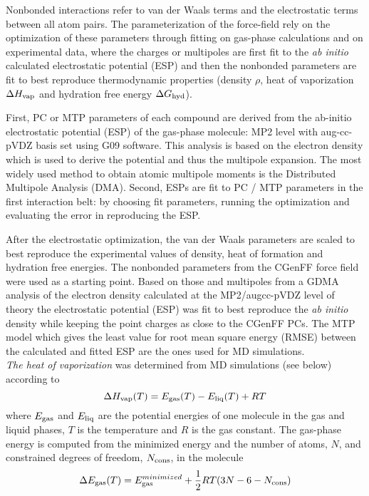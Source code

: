 \documentclass[journal=jacsat,manuscript=article]{achemso}
\begin{document}
\noindent
Nonbonded interactions refer to van der Waals terms and the
electrostatic terms between all atom pairs. The parameterization of
the force-field rely on the optimization of these parameters through
fitting on gas-phase calculations and on experimental data, where the
charges or multipoles are first fit to the {\it ab initio} calculated
electrostatic potential (ESP) and then the nonbonded parameters are
fit to best reproduce thermodynamic properties (density $\rho$, heat
of vaporization $\Delta H_{\rm vap}$ and hydration free energy $\Delta
G_{\rm hyd}$).
 
\noindent
First, PC or MTP parameters of each compound are derived from the
ab-initio electrostatic potential (ESP) of the gas-phase molecule: MP2
level with aug-cc-pVDZ basis set using G09 software. This analysis is
based on the electron density which is used to derive the potential
and thus the multipole expansion. The most widely used method to
obtain atomic multipole moments is the Distributed Multipole Analysis
(DMA).  Second, ESPs are fit to PC / MTP parameters in the first
interaction belt: by choosing fit parameters, running the optimization
and evaluating the error in reproducing the ESP.

\noindent
After the electrostatic optimization, the van der Waals parameters are
scaled to best reproduce the experimental values of density, heat of
formation and hydration free energies. The nonbonded parameters from
the CGenFF\cite{cgenff2012} force field were used as a starting
point. Based on those and multipoles from a GDMA
analysis\cite{Stone05p1128} of the electron density calculated at the
MP2\cite{gordon88mp2}/augcc-pVDZ\cite{dunning89BtoNe,dunning93AltoAr}
level of theory the electrostatic potential (ESP) was fit to best
reproduce the {\it ab initio} density while keeping the point charges
as close to the CGenFF PCs. The MTP model which gives the least value
for root mean square energy (RMSE) between the calculated and fitted
ESP are the ones used for MD simulations.  \\

\noindent
{\it The heat of vaporization} was determined from MD simulations (see
below) according to\cite{junmei2011}
   \begin{equation} 
   \label{heat_eqn}
   \Delta H_{\rm vap}(T) = E_{\rm gas}(T) -  E_{\rm liq}(T) + RT
   \end{equation}
where $E_{\rm gas}$ and $E_{\rm liq}$ are the potential energies of
one molecule in the gas and liquid phases, $T$ is the temperature and
$R$ is the gas constant.  The gas-phase energy is computed from the
minimized energy and the number of atoms, $N$, and constrained degrees
of freedom, $N_{\rm cons}$, in the molecule
   \begin{equation} 
   \label{heat_eqn2}
   \Delta E_{\rm gas}(T) = E_{\rm gas}^{minimized} +
   \frac{1}{2}RT(3N-6-N_{\rm cons})
   \end{equation}
\end{document}
